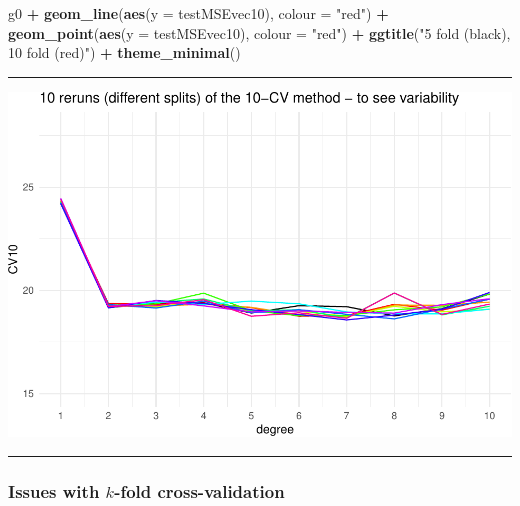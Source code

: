 \documentclass[]{article}
\newenvironment{Shaded}{\begin{snugshade}}{\end{snugshade}}
\newcommand{\DataTypeTok}[1]{\textcolor[rgb]{0.13,0.29,0.53}{#1}}
\newcommand{\KeywordTok}[1]{\textcolor[rgb]{0.13,0.29,0.53}{\textbf{#1}}}
\newcommand{\NormalTok}[1]{#1}
\newcommand{\OperatorTok}[1]{\textcolor[rgb]{0.81,0.36,0.00}{\textbf{#1}}}
\newcommand{\StringTok}[1]{\textcolor[rgb]{0.31,0.60,0.02}{#1}}
\begin{document}
\begin{Shaded}
\begin{Highlighting}[]
\NormalTok{g0 }\OperatorTok{+}\StringTok{ }\KeywordTok{geom_line}\NormalTok{(}\KeywordTok{aes}\NormalTok{(}\DataTypeTok{y =}\NormalTok{ testMSEvec10), }\DataTypeTok{colour =} \StringTok{"red"}\NormalTok{) }\OperatorTok{+}\StringTok{ }\KeywordTok{geom_point}\NormalTok{(}\KeywordTok{aes}\NormalTok{(}\DataTypeTok{y =}\NormalTok{ testMSEvec10), }
    \DataTypeTok{colour =} \StringTok{"red"}\NormalTok{) }\OperatorTok{+}\StringTok{ }\KeywordTok{ggtitle}\NormalTok{(}\StringTok{"5 fold (black), 10 fold (red)"}\NormalTok{) }\OperatorTok{+}\StringTok{ }\KeywordTok{theme_minimal}\NormalTok{()}
\end{Highlighting}
\end{Shaded}

\normalsize

\begin{center}\rule{0.5\linewidth}{\linethickness}\end{center}

\includegraphics{5Resample_files/figure-latex/unnamed-chunk-7-1.pdf}

\begin{center}\rule{0.5\linewidth}{\linethickness}\end{center}

\hypertarget{issues-with-k-fold-cross-validation}{%
\subsubsection{\texorpdfstring{Issues with \(k\)-fold
cross-validation}{Issues with k-fold cross-validation}}\label{issues-with-k-fold-cross-validation}}
\end{document}
